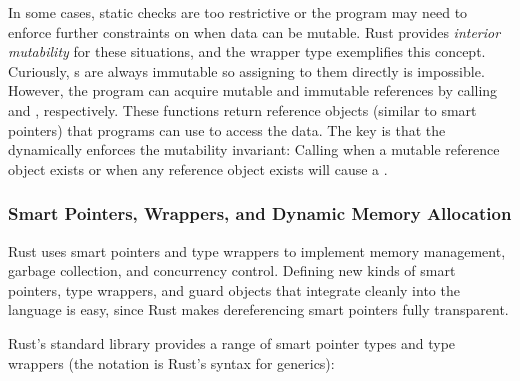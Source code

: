In some cases, static checks are too restrictive or the program may need to
enforce further constraints on when data can be mutable.  Rust provides
\emph{interior mutability} for these situations, and the wrapper type
 exemplifies this concept.  Curiously, s are always
immutable so assigning to them directly is impossible.  However, the program
can acquire mutable and immutable references by calling
 and , respectively.  These
functions return reference objects (similar to smart pointers) that programs
can use to access the data.  The key is that the 
dynamically enforces the mutability invariant: Calling  when a
mutable reference object exists or  when any reference object
exists will cause a .



\subsubsection{Smart Pointers, Wrappers, and Dynamic Memory Allocation}
\label{sec:wrapper}

Rust uses smart pointers and type wrappers to implement memory management,
garbage collection, and concurrency control.  Defining new kinds of smart
pointers, type wrappers, and guard objects that integrate cleanly into the language is easy,
since Rust makes dereferencing smart pointers fully transparent.

Rust's standard library provides a range of smart pointer types and type
wrappers (the \csym{<>} notation is Rust's syntax for generics):

